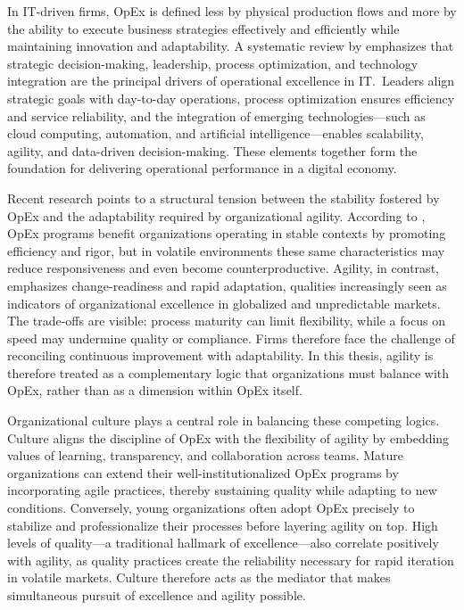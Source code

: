 In IT-driven firms, OpEx is defined less by physical production flows and more by the ability to execute business strategies effectively and efficiently while maintaining innovation and adaptability. A systematic review by \textcite{owoadeSystematic2024} emphasizes that strategic decision-making, leadership, process optimization, and technology integration are the principal drivers of operational excellence in IT.~Leaders align strategic goals with day-to-day operations, process optimization ensures efficiency and service reliability, and the integration of emerging technologies---such as cloud computing, automation, and artificial intelligence---enables scalability, agility, and data-driven decision-making. These elements together form the foundation for delivering operational performance in a digital economy.

Recent research points to a structural tension between the stability fostered by OpEx and the adaptability required by organizational agility. According to \textcite{carvalhoOperational2023}, OpEx programs benefit organizations operating in stable contexts by promoting efficiency and rigor, but in volatile environments these same characteristics may reduce responsiveness and even become counterproductive. Agility, in contrast, emphasizes change-readiness and rapid adaptation, qualities increasingly seen as indicators of organizational excellence in globalized and unpredictable markets. The trade-offs are visible: process maturity can limit flexibility, while a focus on speed may undermine quality or compliance. Firms therefore face the challenge of reconciling continuous improvement with adaptability. In this thesis, agility is therefore treated as a complementary logic that organizations must balance with OpEx, rather than as a dimension within OpEx itself.

Organizational culture plays a central role in balancing these competing logics. Culture aligns the discipline of OpEx with the flexibility of agility by embedding values of learning, transparency, and collaboration across teams. Mature organizations can extend their well-institutionalized OpEx programs by incorporating agile practices, thereby sustaining quality while adapting to new conditions. Conversely, young organizations often adopt OpEx precisely to stabilize and professionalize their processes before layering agility on top. High levels of quality---a traditional hallmark of excellence---also correlate positively with agility, as quality practices create the reliability necessary for rapid iteration in volatile markets. Culture therefore acts as the mediator that makes simultaneous pursuit of excellence and agility possible.

